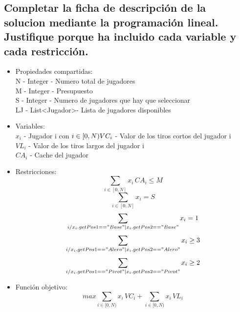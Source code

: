 \documentclass[a4paper,12pt]{article}
\begin{document}
\subsection{Completar la ficha de descripción de la solucion mediante la programación lineal. Justifique porque ha incluido cada variable y cada restricción.}

\begin{itemize}
\item Propiedades compartidas:\\
N - Integer - Numero total de jugadores\\
M - Integer - Presupuesto\\
S - Integer - Numero de jugadores que hay que seleccionar\\
LJ - List\textless Jugador\textgreater - Lista de jugadores disponibles\\
\item Variables:\\
\begin{math}
 x_i
\end{math}
- Jugador i con
\begin{math}
  i \in [0,N)\\
VC_i
\end{math}
- Valor de los tiros cortos del jugador i\\
\begin{math}
VL_i
\end{math}
- Valor de los tiros largos del jugador i\\
 \begin{math}
CA_i
 \end{math}
 - Cache del jugador\\

\item Restricciones:\\
\setcounter{equation}{0}
\begin{equation}
 \sum_{i \in [0,N]}{x_i \, CA_i} \leq M
\end{equation}
 \begin{equation}
 \sum_{i \in [0,N]}{x_i} = S
\end{equation}
\begin{equation}
 \sum_{i / x_i.getPos1=="Base" | x_i.getPos2=="Base"}{x_i} = 1
\end{equation}
\begin{equation}
 \sum_{i / x_i.getPos1=="Alero" | x_i.getPos2=="Alero"}{x_i} \geq 3
\end{equation}
\begin{equation}
 \sum_{i / x_i.getPos1=="Pivot" | x_i.getPos2=="Pivot"}{x_i} \geq 2
\end{equation}
\item{Función objetivo:}
\begin{equation*}
max  \sum_{i \in [0,N)}{x_i \, VC_i}+\sum_{i \in [0,N)}{x_i \, VL_i}
\end{equation*}
\end{itemize}
\end{document}
